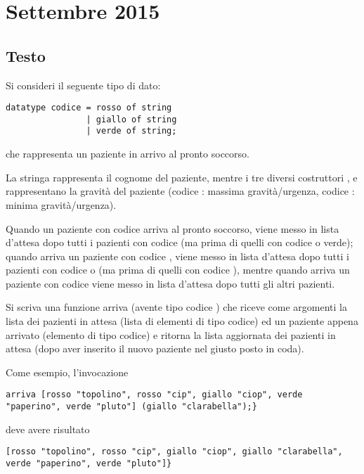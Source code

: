 \section{Settembre 2015}

\subsection{Testo}

Si consideri il seguente tipo di dato:

\begin{lstlisting}[style = SML, caption = {Definizione del tipo di dato \sml{codice}}]
datatype codice = rosso of string
				| giallo of string
				| verde of string;
\end{lstlisting}

che rappresenta un paziente in arrivo al pronto soccorso.

\medskip
La stringa rappresenta il cognome del paziente, mentre i tre diversi costruttori ,  e  rappresentano la gravità del paziente (codice : massima gravità/urgenza, codice : minima gravità/urgenza).

\medskip
Quando un paziente con codice  arriva al pronto soccorso, viene messo in lista d'attesa dopo tutti i pazienti con codice  (ma prima di quelli con codice  o verde); quando arriva un paziente con codice , viene messo in lista d'attesa dopo tutti i pazienti con codice  o  (ma prima di quelli con codice ), mentre quando arriva un paziente con codice  viene messo in lista d'attesa dopo tutti gli altri pazienti.

\medskip
Si scriva una funzione arriva (avente tipo codice ) che riceve come argomenti la lista dei pazienti in attesa (lista di elementi di tipo codice) ed un paziente appena arrivato (elemento di tipo codice) e ritorna la lista aggiornata dei pazienti in attesa (dopo aver inserito il nuovo paziente nel giusto posto in coda).

\medskip
Come esempio, l'invocazione

\begin{lstlisting}
arriva [rosso "topolino", rosso "cip", giallo "ciop", verde "paperino", verde "pluto"] (giallo "clarabella");}
\end{lstlisting}

deve avere risultato

\begin{lstlisting}
[rosso "topolino", rosso "cip", giallo "ciop", giallo "clarabella", verde "paperino", verde "pluto"]}
\end{lstlisting}

